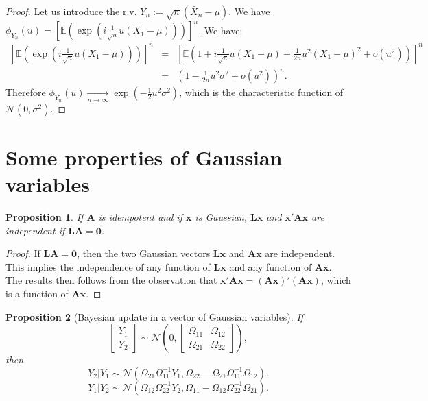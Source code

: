 \documentclass[
  12pt,
]{book}
\newtheorem{proposition}{Proposition}[chapter]
\theoremstyle{definition}
\theoremstyle{definition}
\theoremstyle{definition}
\theoremstyle{definition}
\theoremstyle{remark}
\begin{document}
\begin{proof}
Let us introduce the r.v. \(Y_n:= \sqrt{n}(\bar{X}_n - \mu)\). We have \(\phi_{Y_n}(u) = \left[ \mathbb{E}\left( \exp(i \frac{1}{\sqrt{n}} u (X_1 - \mu)) \right) \right]^n\). We have:
\begin{eqnarray*}
\left[ \mathbb{E}\left( \exp\left(i \frac{1}{\sqrt{n}} u (X_1 - \mu)\right) \right) \right]^n &=& \left[ \mathbb{E}\left( 1 + i \frac{1}{\sqrt{n}} u (X_1 - \mu) - \frac{1}{2n} u^2 (X_1 - \mu)^2 + o(u^2) \right) \right]^n \\
&=& \left( 1 - \frac{1}{2n}u^2\sigma^2 + o(u^2)\right)^n.
\end{eqnarray*}
Therefore \(\phi_{Y_n}(u) \underset{n \rightarrow \infty}{\rightarrow} \exp \left( - \frac{1}{2}u^2\sigma^2 \right)\), which is the characteristic function of \(\mathcal{N}(0,\sigma^2)\).
\end{proof}

\hypertarget{GaussianVar}{%
\section{Some properties of Gaussian variables}\label{GaussianVar}}

\begin{proposition}
\protect\hypertarget{prp:bandsindependent}{}\label{prp:bandsindependent}If \(\mathbf{A}\) is idempotent and if \(\mathbf{x}\) is Gaussian, \(\mathbf{L}\mathbf{x}\) and \(\mathbf{x}'\mathbf{A}\mathbf{x}\) are independent if \(\mathbf{L}\mathbf{A}=\mathbf{0}\).
\end{proposition}

\begin{proof}
If \(\mathbf{L}\mathbf{A}=\mathbf{0}\), then the two Gaussian vectors \(\mathbf{L}\mathbf{x}\) and \(\mathbf{A}\mathbf{x}\) are independent. This implies the independence of any function of \(\mathbf{L}\mathbf{x}\) and any function of \(\mathbf{A}\mathbf{x}\). The results then follows from the observation that \(\mathbf{x}'\mathbf{A}\mathbf{x}=(\mathbf{A}\mathbf{x})'(\mathbf{A}\mathbf{x})\), which is a function of \(\mathbf{A}\mathbf{x}\).
\end{proof}

\begin{proposition}[Bayesian update in a vector of Gaussian variables]
\protect\hypertarget{prp:update}{}\label{prp:update}If
\[
\left[
\begin{array}{c}
Y_1\\
Y_2
\end{array}
\right]
\sim \mathcal{N}
\left(0,
\left[\begin{array}{cc}
\Omega_{11} & \Omega_{12}\\
\Omega_{21} & \Omega_{22}
\end{array}\right]
\right),
\]
then
\[
Y_{2}|Y_{1} \sim \mathcal{N}
\left(
\Omega_{21}\Omega_{11}^{-1}Y_{1},\Omega_{22}-\Omega_{21}\Omega_{11}^{-1}\Omega_{12}
\right).
\]
\[
Y_{1}|Y_{2} \sim \mathcal{N}
\left(
\Omega_{12}\Omega_{22}^{-1}Y_{2},\Omega_{11}-\Omega_{12}\Omega_{22}^{-1}\Omega_{21}
\right).
\]
\end{proposition}
\end{document}
